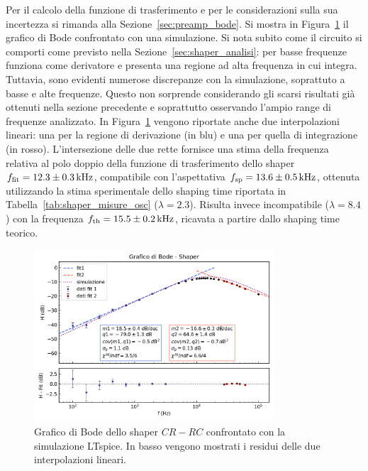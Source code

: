 Per il calcolo della funzione di trasferimento e per le considerazioni sulla sua incertezza
si rimanda alla Sezione~\ref{sec:preamp_bode}. Si mostra in Figura~\ref{fig:shaper_bode} il grafico di Bode
confrontato con una simulazione. Si nota subito come il circuito si comporti come previsto
nella Sezione~\ref{sec:shaper_analisi}: per basse frequenze funziona come derivatore e presenta
una regione ad alta frequenza in cui integra. Tuttavia, sono evidenti numerose discrepanze con la simulazione, soprattuto a basse e alte frequenze. Questo non sorprende considerando gli scarsi
risultati già ottenuti nella sezione precedente e soprattutto osservando l'ampio range di
frequenze analizzato.
In Figura~\ref{fig:shaper_bode} vengono riportate anche due interpolazioni lineari: una per la
regione di derivazione (in blu) e una per quella di integrazione (in rosso).
L'intersezione delle due rette fornisce una stima della frequenza relativa
al polo doppio della funzione di trasferimento dello shaper $f_{\text{fit}}=12.3\pm 0.3 \kHz$,
compatibile con l'aspettativa $f_{\text{sp}}=13.6\pm 0.5\kHz$, ottenuta utilizzando la stima sperimentale
dello shaping time riportata in Tabella~\ref{tab:shaper_misure_osc} ($\lambda=2.3$). Risulta invece incompatibile ($\lambda=8.4$) con la frequenza
$f_{\text{th}}=15.5\pm 0.2\kHz$, ricavata a partire dallo shaping time teorico.
\begin{figure}[h]
\centering
\includegraphics[width=0.8\textwidth]{../shaper/images/fit_bode}
\caption{\footnotesize Grafico di Bode dello shaper $CR-RC$ confrontato con la simulazione LTspice. In basso vengono mostrati i residui delle due interpolazioni lineari.}\label{fig:shaper_bode}
\end{figure}


